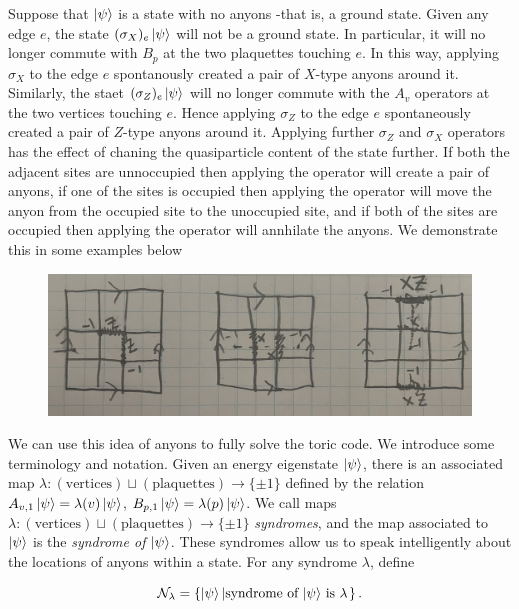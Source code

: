 \documentclass{article}
\theoremstyle{definition}
\newcommand{\NN}{\mathcal{N}}
\newcommand{\0}{\left|0\right>}
\newcommand{\1}{\left|1\right>}
\numberwithin{figure}{section}
\begin{document}
Suppose that $\ket{\psi}$ is a state with no anyons -that is, a ground state. Given any edge $e$, the state $(\sigma_X)_e \ket{\psi}$ will not be a ground state. In particular, it will no longer commute with $B_p$ at the two plaquettes touching $e$. In this way, applying $\sigma_X$ to the edge $e$ spontanously created a pair of $X$-type anyons around it. Similarly, the staet $(\sigma_Z)_e\ket{\psi}$ will no longer commute with the $A_v$ operators at the two vertices touching $e$. Hence applying $\sigma_Z$ to the edge $e$ spontaneously created a pair of $Z$-type anyons around it. Applying further $\sigma_Z$ and $\sigma_X$ operators has the effect of chaning the quasiparticle content of the state further. If both the adjacent sites are unnoccupied then applying the operator will create a pair of anyons, if one of the sites is occupied then applying the operator will move the anyon from the occupied site to the unoccupied site, and if both of the sites are occupied then applying the operator will annhilate the anyons. We demonstrate this in some examples below

\begin{figure}[h]
\begin{center}
\includegraphics[scale=.04]{anyon-examples}
\end{center}
\end{figure}

We can use this idea of anyons to fully solve the toric code. We introduce some terminology and notation. Given an energy eigenstate $\ket{\psi}$, there is an associated map $\lambda: (\text{vertices})\sqcup (\text{plaquettes})\to \{\pm 1\}$ defined by the relation $A_{v,1}\ket{\psi}=\lambda(v)\ket{\psi}$, $B_{p,1}\ket{\psi}=\lambda(p)\ket{\psi}$. We call maps $\lambda: (\text{vertices})\sqcup (\text{plaquettes})\to \{\pm 1\}$ \textit{syndromes}, and the map associated to $\ket{\psi}$ is the \textit{syndrome of $\ket{\psi}$}. These syndromes allow us to speak intelligently about the locations of anyons within a state. For any syndrome $\lambda$, define

$$\NN_\lambda=\left\{\ket{\psi}\left| \text{syndrome of $\ket{\psi}$ is $\lambda$}\right.\right\}.$$
\end{document}
